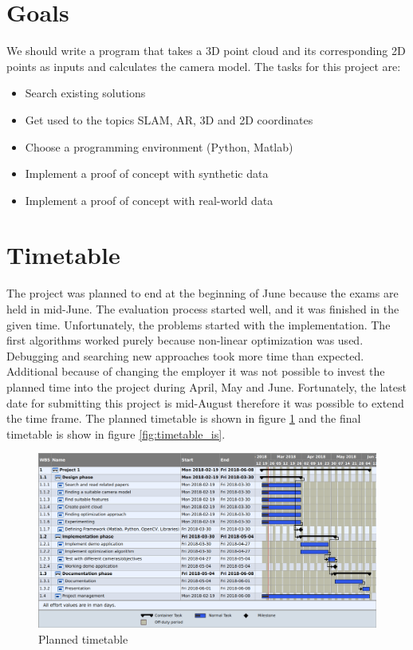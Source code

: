 \documentclass[11pt,a4paper,titlepage,oneside]{report}
\begin{document}
\section{Goals}
We should write a program that takes a 3D point cloud and its corresponding 2D points as inputs and calculates the camera model. The tasks for this project are:
\begin{itemize}
\item Search existing solutions
\item Get used to the topics SLAM, AR, 3D and 2D coordinates
\item Choose a programming environment (Python, Matlab)
\item Implement a proof of concept with synthetic data
\item Implement a proof of concept with real-world data
\end{itemize}

\section{Timetable}

The project was planned to end at the beginning of June because the exams are held in mid-June. The evaluation process started well, and it was finished in the given time. Unfortunately, the problems started with the implementation. The first algorithms worked purely because non-linear optimization was used. Debugging and searching new approaches took more time than expected. Additional because of changing the employer it was not possible to invest the planned time into the project during April, May and June. Fortunately, the latest date for submitting this project is mid-August therefore it was possible to extend the time frame. The planned timetable is shown in figure \ref{fig:timetable_should} and the final timetable is show in figure \ref{fig:timetable_is}.
\begin{figure}[H]
	\includegraphics[width=1.0\textwidth]{img/timetable_should.png}
	\caption{Planned timetable}\label{fig:timetable_should}
\end{figure}
\end{document}
